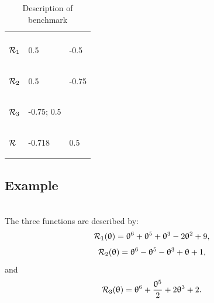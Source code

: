 \documentclass[article,authoryear,jmlmc]{beg_32}             %
\begin{document}
\begin{table}[h!]
	\centering
	\caption{Description of benchmark \exSix}
	\begin{tabular}{lll}
		
		\begin{bf} \diagbox{Functions}{Minima} \end{bf} & \begin{bf}\mg\end{bf} & \begin{bf}\ml\end{bf} \\
		
		
		\begin{bf}$\mathcal{R}_1$\end{bf} & 0.5 & -0.5  \\ 
		\begin{bf}$\mathcal{R}_2$\end{bf} & 0.5 & -0.75 \\ 
		\begin{bf}$\mathcal{R}_3$\end{bf} & -0.75; 0.5  &  \\ 
		\begin{bf}$\mathcal{R}$\end{bf}   & -0.718 &  0.5 \\ 
	\end{tabular}
	\label{ex6_example}
\end{table}

\subsection{Example \exSeven}
~~\\
The three functions are described by:
\begin{equation*}
	\mathcal{R}_1(\uptheta) = \uptheta^6+\uptheta^5+\uptheta^3-2\uptheta^2+9,
\end{equation*}
\begin{equation*}
	\mathcal{R}_2(\uptheta) = \uptheta^6-\uptheta^5-\uptheta^3+\uptheta+1,
\end{equation*}
and
\begin{equation*}
	\mathcal{R}_3(\uptheta) = \uptheta^6+\frac{\uptheta^5}{2}+2\uptheta^3+2.
\end{equation*}
\end{document}
